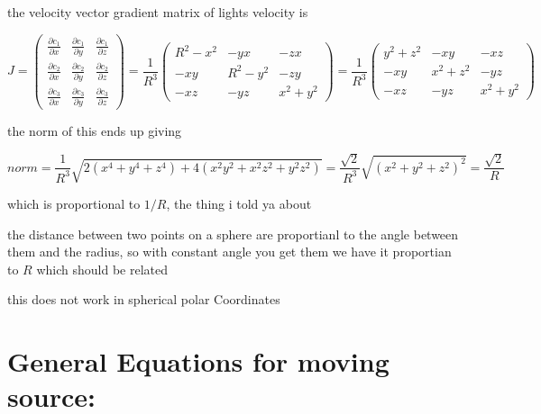 the velocity vector gradient matrix of lights velocity is

\begin{equation}
J =
\begin{pmatrix}
	\frac{\partial c_1}{\partial x} & \frac{\partial c_1}{\partial y} & \frac{\partial c_1}{\partial z} \\
	\frac{\partial c_2}{\partial x} & \frac{\partial c_2}{\partial y} & \frac{\partial c_2}{\partial z}  
	 \\
	\frac{\partial c_3}{\partial x} & \frac{\partial c_3}{\partial y} & \frac{\partial c_3}{\partial z}
	\end{pmatrix}
	= \frac{1}{ R^3 }
	\begin{pmatrix}
		R^2 - x^2 & - y x & -  z  x \\
		- x y & R^2 - y^2 & -  z   y  \\
		 - x z & - y z & x^2 + y^2
	\end{pmatrix}
    = \frac{1}{ R^3 }
    \begin{pmatrix}
        y^2 + z^2 &   -xy     &    -xz   \\
           -xy    & x^2 + z^2 &    -yz   \\
           -xz    &   -yz     & x^2 + y^2
    \end{pmatrix}
\end{equation}

the norm of this ends up giving

\begin{equation}
	norm = \frac{1}{R^3} \sqrt{2(x^4 + y^4 + z^4) + 4 (x^2y^2 + x^2z^2 + y^2z^2)} = \frac{\sqrt{2}}{R^3} \sqrt{(x^2 + y^2 + z^2)^2} = \frac{\sqrt{2}}{ R }
\end{equation}

which is proportional to $1/R$, the thing i told ya about

the distance between two points on a sphere are proportianl to the angle between them and the radius, so with constant angle you get them we have it proportian to $R$ which should be related

this does not work in spherical polar Coordinates

\section{General Equations for moving source:}

